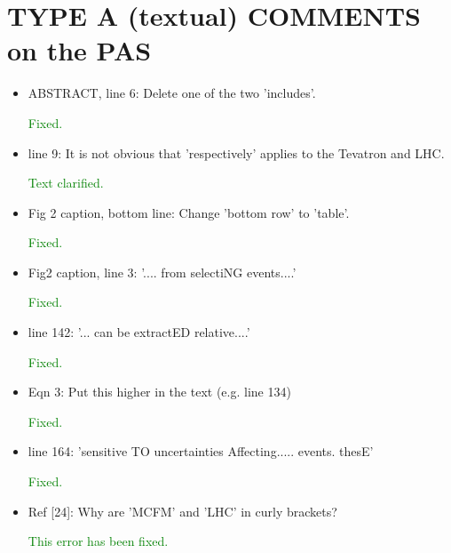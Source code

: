 \documentclass[paper=a4, fontsize=11pt]{scrartcl}
\begin{document}
\section{TYPE A (textual) COMMENTS on the PAS}
\begin{itemize}
\item ABSTRACT, line 6:	Delete one of the two 'includes'.

\textcolor{green}{Fixed.}\\

\item line 9: It is not obvious that 'respectively' applies to the Tevatron and LHC.

\textcolor{green}{Text clarified.}\\

 \item Fig 2 caption, bottom line: Change 'bottom row' to 'table'.

\textcolor{green}{Fixed.}\\


\item Fig2 caption, line 3: '.... from selectiNG events....' 

\textcolor{green}{Fixed.}\\

\item line 142: '... can be extractED relative....' 

\textcolor{green}{Fixed.}\\

\item Eqn 3: Put this higher in the text (e.g. line 134) 

\textcolor{green}{Fixed.}\\

\item line 164: 'sensitive TO uncertainties Affecting..... events. thesE' 

\textcolor{green}{Fixed.}\\

\item Ref [24]: Why are 'MCFM' and 'LHC' in curly brackets?

\textcolor{green}{This error has been fixed.}\\

\end{itemize}
\end{document}

